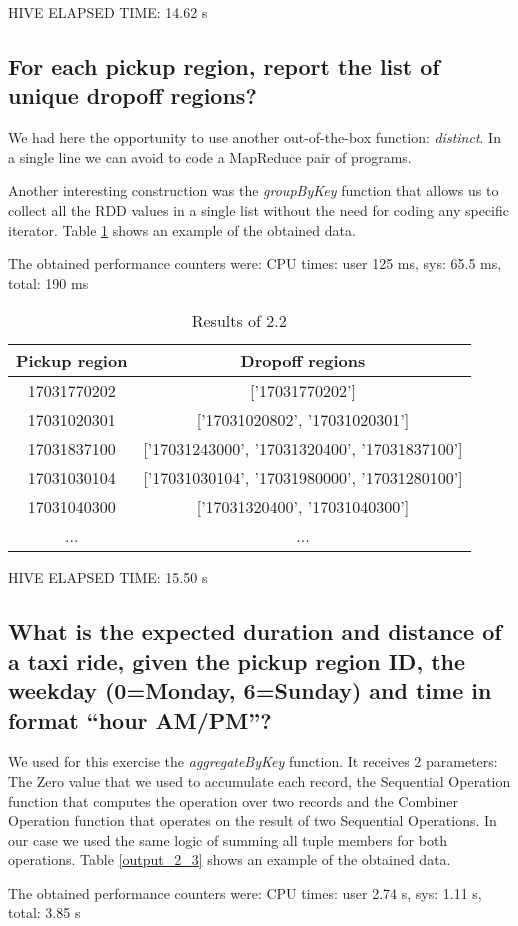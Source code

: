\documentclass[conference,compsoc]{IEEEtran}
\begin{document}
HIVE ELAPSED TIME: 14.62 s

\subsection{For each pickup region, report the list of unique dropoff regions?}
We had here the opportunity to use another out-of-the-box function: \textit{distinct}. In a single line we can avoid to code a MapReduce pair of programs. \par Another interesting construction was the \textit{groupByKey} function that allows us to collect all the RDD values in a single list without the need for coding any specific iterator.  Table \ref{output_2_2} shows an example of the obtained data.  \par
The obtained performance counters were: CPU times: user 125 ms, sys: 65.5 ms, total: 190 ms

\begin{table}[!t]
\renewcommand{\arraystretch}{1.3}
\caption{Results of 2.2}
\label{output_2_2}
\centering
\begin{tabular}{c||c}
\hline
\bfseries Pickup region & \bfseries Dropoff regions\\
\hline\hline

17031770202 &['17031770202']\\
17031020301 &['17031020802', '17031020301']\\
17031837100 &['17031243000', '17031320400', '17031837100']\\
17031030104 &['17031030104', '17031980000', '17031280100']\\
17031040300 &['17031320400', '17031040300']\\
... &...\\
\hline
\end{tabular}
\end{table}

HIVE ELAPSED TIME: 15.50 s

\subsection{What is the expected duration and distance of a taxi ride, given the pickup region ID, the weekday (0=Monday, 6=Sunday) and time in format “hour AM/PM”?}

We used for this exercise the \textit{aggregateByKey} function. It receives 2 parameters: The Zero value that we used to accumulate each record, the Sequential Operation function that computes the operation over two records and the Combiner Operation function that operates on the result of two Sequential Operations. In our case we used the same logic of summing all tuple members for both operations. Table \ref{output_2_3} shows an example of the obtained data. \par
The obtained performance counters were: CPU times: user 2.74 s, sys: 1.11 s, total: 3.85 s
\end{document}
